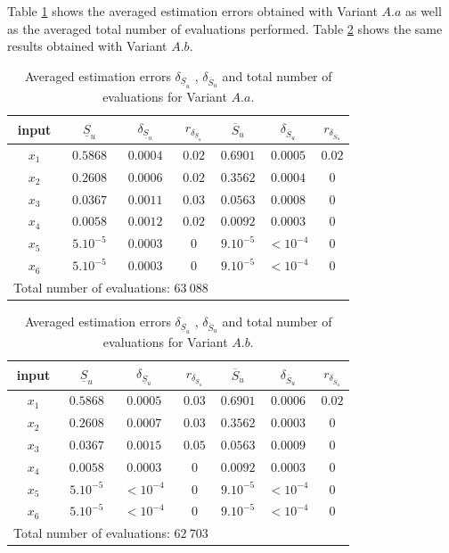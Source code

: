 Table \ref{res.gfunc.Aa} shows the averaged estimation errors obtained with Variant $A.a$ as well as the averaged total number of evaluations performed. Table \ref{res.gfunc.Ab} shows the same results obtained with Variant $A.b$.
\renewcommand{\arraystretch}{1.25}
\begin{table}[!ht]
\caption{Averaged estimation errors $\delta_{\underline{S}_u}$ , $\delta_{\overline{S}_u}$ and total number of evaluations for Variant $A.a$.}
\centering
\begin{tabular}{ccccccc}
\hline
 input & $\underline{S}_u$ & $\delta_{\underline{S}_u}$ & $r_{\delta_{\underline{S}_u}}$ & $\overline{S}_u$ & $\delta_{\overline{S}_u}$ &$r_{\delta_{\overline{S}_u}}$ \\ \hline
 $x_1$ & $0.5868$ &  $0.0004$ & $0.02$ & $0.6901$ & $0.0005$ & $0.02$ \\ \hline
 $x_2$ & $0.2608$ &  $0.0006$ & $0.02$ & $0.3562$ & $0.0004$ & $0$ \\ \hline
 $x_3$ & $0.0367$ &  $0.0011$ & $0.03$ & $0.0563$ & $0.0008$ & $0$ \\ \hline
 $x_4$ & $0.0058$ &  $0.0012$ & $0.02$ & $0.0092$ & $0.0003$ & $0$ \\ \hline
 $x_5$ & $5.10^{-5}$ & $0.0003$ & $0$ & $9.10^{-5}$ & $< 10^{-4}$ & $0$ \\ \hline
 $x_6$ & $5.10^{-5}$ & $0.0003$ & $0$  & $9.10^{-5}$ & $< 10^{-4}$ & $0$ \\ \hline \hline
\multicolumn{4}{l}{Total number of evaluations: $63 \ 088$} & & &\\ \hline 
\end{tabular}
\label{res.gfunc.Aa}
\end{table}
\begin{table}[!ht]
\caption{Averaged estimation errors $\delta_{\underline{S}_u}$ , $\delta_{\overline{S}_u}$ and total number of evaluations for Variant $A.b$.}
\centering
\begin{tabular}{ccccccc}
\hline
 input & $\underline{S}_u$ & $\delta_{\underline{S}_u}$ & $r_{\delta_{\underline{S}_u}}$ & $\overline{S}_u$ & $\delta_{\overline{S}_u}$ &$r_{\delta_{\overline{S}_u}}$ \\ \hline
 $x_1$ & $0.5868$ &  $0.0005$ & $0.03$ & $0.6901$ & $0.0006$ & $0.02$ \\ \hline
 $x_2$ & $0.2608$ &  $0.0007$ & $0.03$ & $0.3562$ & $0.0003$ & $0$ \\ \hline
 $x_3$ & $0.0367$ &  $0.0015$ & $0.05$ & $0.0563$ & $0.0009$ & $0$ \\ \hline
 $x_4$ & $0.0058$ &  $0.0003$ & $0$ & $0.0092$ & $0.0003$ & $0$ \\ \hline
 $x_5$ & $5.10^{-5}$ & $< 10^{-4}$ & $0$ & $9.10^{-5}$ & $< 10^{-4}$ & $0$ \\ \hline
 $x_6$ & $5.10^{-5}$ & $< 10^{-4}$ & $0$  & $9.10^{-5}$ & $< 10^{-4}$ & $0$ \\ \hline \hline
\multicolumn{4}{l}{Total number of evaluations: $62 \ 703$} & & &\\ \hline 
\end{tabular}
\label{res.gfunc.Ab}
\end{table}
